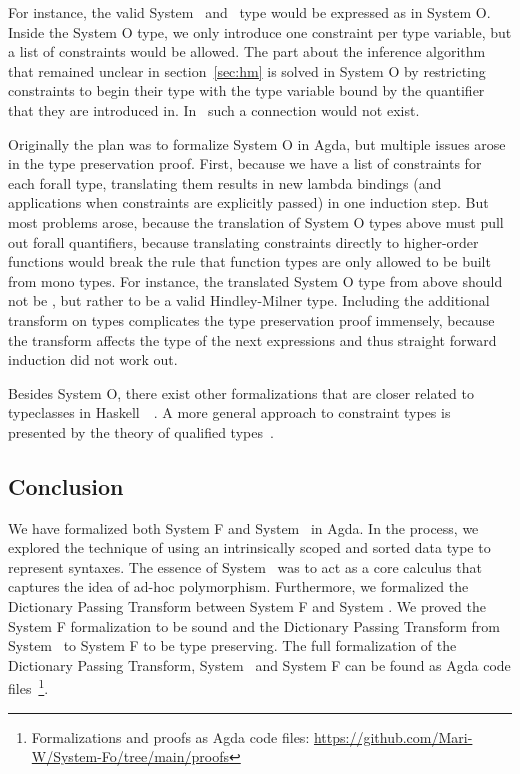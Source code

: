 \noindent For instance, the valid System \Fo\ and \HMo\ type  would be expressed as  in System O. 
Inside the System O type, we only introduce one constraint per type variable, but a list of constraints would be allowed. 
The part about the inference algorithm that remained unclear in section~\ref{sec:hm} is solved in System O by restricting constraints to begin their type with the type variable bound by the quantifier that they are introduced in. 
In \HMo\ such a connection would not exist.

\noindent Originally the plan was to formalize System O in Agda, but multiple issues arose in the type preservation proof. 
First, because we have a list of  constraints for each forall type, translating them results in  new lambda bindings (and  applications when constraints are explicitly passed) in one induction step. 
But most problems arose, because the translation of System O types above must pull out forall quantifiers, because translating constraints directly to higher-order functions would break the rule that function types are only allowed to be built from mono types. 
For instance, the translated System O type from above should not be , but rather  to be a valid Hindley-Milner type. 
Including the additional transform on types complicates the type preservation proof immensely, because the transform affects the type of the next  expressions and thus straight forward induction did not work out.

\noindent Besides System O, there exist other formalizations that are closer related to typeclasses in Haskell~\cite{ahp}~\cite{tc}. A more general approach to constraint types is presented by the theory of qualified types~\cite{qt}.

\subsection{Conclusion}
We have formalized both System F and System \Fo\ in Agda.
In the process, we explored the technique of using an intrinsically scoped and sorted data type to represent syntaxes.
The essence of System \Fo\ was to act as a core calculus that captures the idea of ad-hoc polymorphism.
Furthermore, we formalized the Dictionary Passing Transform between System F and System \Fo. 
We proved the System F formalization to be sound and the Dictionary Passing Transform from System \Fo\ to System F to be type preserving. 
The full formalization of the Dictionary Passing Transform, System \Fo\ and  System F can be found as Agda code files~\footnote{Formalizations and proofs as Agda code files: \url{https://github.com/Mari-W/System-Fo/tree/main/proofs}}. 

